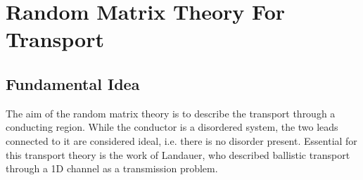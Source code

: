\section{Random Matrix Theory For Transport}\label{sec:random-matrix}

\subsection{Fundamental Idea}
The aim of the random matrix theory is to describe the transport through a conducting region. While the conductor is a disordered system, the two leads connected to it are considered ideal, i.e. there is no disorder present. Essential for this transport theory is the work of Landauer, who described ballistic transport through a 1D channel as a transmission problem. 

